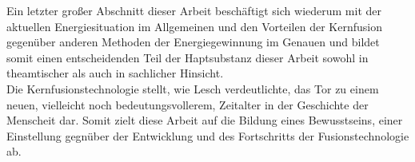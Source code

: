 Ein letzter großer Abschnitt dieser Arbeit beschäftigt sich wiederum mit der aktuellen Energiesituation im Allgemeinen und den Vorteilen der Kernfusion gegenüber anderen Methoden der Energiegewinnung im Genauen und bildet somit einen entscheidenden Teil der Haptsubstanz dieser Arbeit sowohl in theamtischer als auch in sachlicher Hinsicht.\\
Die Kernfusionstechnologie stellt, wie Lesch verdeutlichte, das Tor zu einem neuen, vielleicht noch bedeutungsvollerem, Zeitalter in der Geschichte der Menscheit dar. Somit zielt diese Arbeit auf die Bildung eines Bewusstseins, einer Einstellung gegnüber der Entwicklung und des Fortschritts der Fusionstechnologie ab.
